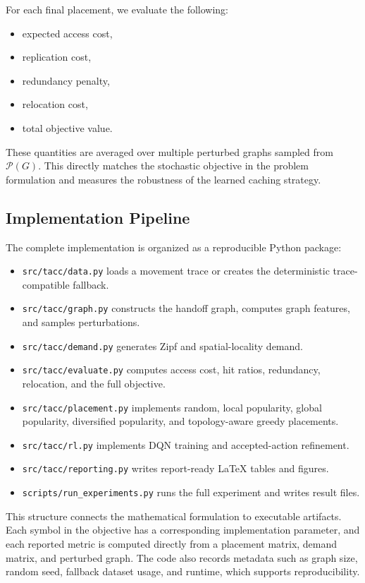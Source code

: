 For each final placement, we evaluate the following:
\begin{itemize}
    \item expected access cost,
    \item replication cost,
    \item redundancy penalty,
    \item relocation cost,
    \item total objective value.
\end{itemize}

These quantities are averaged over multiple perturbed graphs sampled from \(\mathcal{P}(G)\). This directly matches the stochastic objective in the problem formulation and measures the robustness of the learned caching strategy.

\subsection{Implementation Pipeline}

The complete implementation is organized as a reproducible Python package:
\begin{itemize}
    \item \texttt{src/tacc/data.py} loads a movement trace or creates the deterministic trace-compatible fallback.
    \item \texttt{src/tacc/graph.py} constructs the handoff graph, computes graph features, and samples perturbations.
    \item \texttt{src/tacc/demand.py} generates Zipf and spatial-locality demand.
    \item \texttt{src/tacc/evaluate.py} computes access cost, hit ratios, redundancy, relocation, and the full objective.
    \item \texttt{src/tacc/placement.py} implements random, local popularity, global popularity, diversified popularity, and topology-aware greedy placements.
    \item \texttt{src/tacc/rl.py} implements DQN training and accepted-action refinement.
    \item \texttt{src/tacc/reporting.py} writes report-ready LaTeX tables and figures.
    \item \texttt{scripts/run\_experiments.py} runs the full experiment and writes result files.
\end{itemize}

This structure connects the mathematical formulation to executable artifacts. Each symbol in the objective has a corresponding implementation parameter, and each reported metric is computed directly from a placement matrix, demand matrix, and perturbed graph. The code also records metadata such as graph size, random seed, fallback dataset usage, and runtime, which supports reproducibility.

